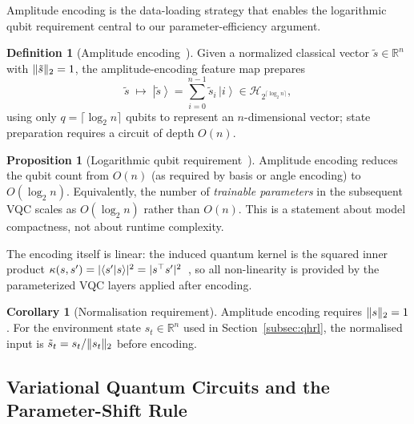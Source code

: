\documentclass[11pt,a4paper]{article}
\theoremstyle{definition}
\newtheorem{definition}{Definition}[section]
\newtheorem{proposition}{Proposition}[section]
\newtheorem{corollary}{Corollary}[section]
\DeclarePairedDelimiter{\abs}{\lvert}{\rvert}
\DeclarePairedDelimiter{\norm}{\lVert}{\rVert}
\newcommand{\ket}[1]{\left\lvert #1 \right\rangle}
\newcommand{\braket}[2]{\left\langle #1 \middle\vert #2 \right\rangle}
\begin{document}
Amplitude encoding is the data-loading strategy that enables the logarithmic qubit requirement central to our parameter-efficiency argument.

\begin{definition}[Amplitude encoding~{\cite{biamonte2017qml}}]
\label{def:amp_enc}
Given a normalized classical vector $\tilde{s} \in \mathbb{R}^n$ with $\norm{\tilde{s}}_2 = 1$, the amplitude-encoding feature map prepares
\begin{equation}
  \tilde{s} \;\mapsto\; \ket{\tilde{s}}
  = \sum_{i=0}^{n-1} \tilde{s}_i\,\ket{i} \in \mathcal{H}_{2^{\lceil\log_2 n\rceil}},
  \label{eq:amp_enc_def}
\end{equation}
using only $q = \lceil\log_2 n\rceil$ qubits to represent an $n$-dimensional vector; state preparation requires a circuit of depth $O(n)$.
\end{definition}

\begin{proposition}[Logarithmic qubit requirement~{\cite{biamonte2017qml}}]
\label{prop:compression}
Amplitude encoding reduces the qubit count from $O(n)$ (as required by basis or angle encoding) to $O(\log_2 n)$. Equivalently, the number of \emph{trainable parameters} in the subsequent VQC scales as $O(\log_2 n)$ rather than $O(n)$. This is a statement about model compactness, not about runtime complexity.
\end{proposition}

The encoding itself is linear: the induced quantum kernel is the squared inner product $\kappa(s,s')=\abs{\braket{s'}{s}}^2=\abs{s^\top s'}^2$~\cite{biamonte2017qml}, so all non-linearity is provided by the parameterized VQC layers applied after encoding.

\begin{corollary}[Normalisation requirement]
\label{cor:norm}
Amplitude encoding requires $\norm{s}_2 = 1$. For the environment state $s_t \in \mathbb{R}^n$ used in Section~\ref{subsec:qhrl}, the normalised input is $\tilde{s}_t = s_t/\norm{s_t}_2$ before encoding.
\end{corollary}

\subsection{Variational Quantum Circuits and the Parameter-Shift Rule}
\label{subsec:psr}
\end{document}
